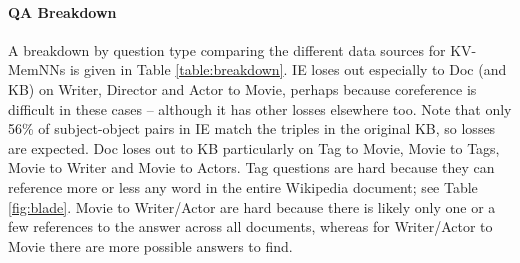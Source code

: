\begin{table}[t!]
	\begin{center}
    	\caption{
	\label{table:breakdown}
{Breakdown of test results (\% hits@1) on \WikiMovies for
Key-Value Memory Networks
using different
knowledge representations.}}
 	\end{center}
\end{table}



\paragraph{QA Breakdown}
A breakdown by question type comparing the different data sources for KV-MemNNs is given
in Table \ref{table:breakdown}. IE loses out especially to Doc (and KB) on
Writer, Director and Actor to Movie, perhaps because coreference is difficult in these cases --
although it has other losses elsewhere too. Note that only 56\% of
subject-object pairs in IE match the triples in the original KB, so losses are expected.
Doc loses out to KB particularly on Tag to Movie, Movie to Tags, Movie to Writer and
Movie to Actors. Tag questions
are hard because they can reference more or less any word in the entire
Wikipedia document; see Table \ref{fig:blade}. Movie to Writer/Actor are hard
because there is likely only one or a few references to the answer across all documents, whereas
for Writer/Actor to Movie there are more possible answers to find.


